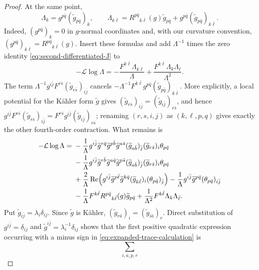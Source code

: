 \documentclass[10pt,a4paper]{amsart}
\begin{document}
\begin{proof}
At the same point,
\[
 \Lambda_k=g^{p\bar q}(\widetilde g_{p\bar q})_k,
 \qquad
 \Lambda_{k\bar\ell}
 =R^{p\bar q}{}_{k\bar\ell}(g)\widetilde g_{p\bar q}
  +g^{p\bar q}(\widetilde g_{p\bar q})_{k\bar\ell}.
\]
Indeed, $(g^{p\bar q})_k=0$ in $g$-normal coordinates and, with
our curvature convention,
$(g^{p\bar q})_{k\bar\ell}=R^{p\bar q}{}_{k\bar\ell}(g)$.
Insert these formulas and add $\Lambda^{-1}$ times the zero identity
\eqref{eq:second-differentiated-J} to
\[
 -\mathcal L\log\Lambda
 =-\frac{F^{k\bar\ell}\Lambda_{k\bar\ell}}{\Lambda}
  +\frac{F^{k\bar\ell}\Lambda_k\Lambda_{\bar\ell}}{\Lambda^2}.
\]
The term
$\Lambda^{-1}g^{i\bar j}F^{r\bar s}
(\widetilde g_{r\bar s})_{i\bar j}$ cancels
$-\Lambda^{-1}F^{k\bar\ell}g^{p\bar q}
(\widetilde g_{p\bar q})_{k\bar\ell}$.  More explicitly, a local
potential for the K\"ahler form $\widetilde g$ gives
$(\widetilde g_{r\bar s})_{i\bar j}
=(\widetilde g_{i\bar j})_{r\bar s}$, and hence
$g^{i\bar j}F^{r\bar s}(\widetilde g_{r\bar s})_{i\bar j}
=F^{r\bar s}g^{i\bar j}(\widetilde g_{i\bar j})_{r\bar s}$;
renaming $(r,s,i,j)$ as $(k,\ell,p,q)$ gives exactly the other
fourth-order contraction.  What remains is
\begin{align}
-\mathcal L\log\Lambda={}&
-\frac1\Lambda g^{i\bar j}\widetilde g^{r\bar q}
 \widetilde g^{p\bar b}\widetilde g^{a\bar s}
 (\widetilde g_{a\bar b})_{\bar j}
 (\widetilde g_{r\bar s})_i\theta_{p\bar q}\notag\\
&-\frac1\Lambda g^{i\bar j}\widetilde g^{r\bar b}
 \widetilde g^{a\bar q}\widetilde g^{p\bar s}
 (\widetilde g_{a\bar b})_{\bar j}
 (\widetilde g_{r\bar s})_i\theta_{p\bar q}\notag\\
&+\frac2\Lambda\operatorname{Re}\!\left(
 g^{i\bar j}\widetilde g^{p\bar\ell}
 \widetilde g^{k\bar q}(\widetilde g_{k\bar\ell})_i
 (\theta_{p\bar q})_{\bar j}\right)
 -\frac1\Lambda g^{i\bar j}\widetilde g^{p\bar q}
 (\theta_{p\bar q})_{i\bar j}\notag\\
&-\frac1\Lambda F^{k\bar\ell}
 R^{p\bar q}{}_{k\bar\ell}(g)\widetilde g_{p\bar q}
 +\frac1{\Lambda^2}F^{k\bar\ell}
 \Lambda_k\Lambda_{\bar\ell}.
\label{eq:expanded-trace-calculation}
\end{align}
Put
$\widetilde g_{i\bar j}=\lambda_i\delta_{ij}$.  Since
$\widetilde g$ is K\"ahler,
$(\widetilde g_{r\bar a})_i=(\widetilde g_{i\bar a})_r$.
Direct substitution of $g^{i\bar j}=\delta_{ij}$ and
$\widetilde g^{i\bar j}=\lambda_i^{-1}\delta_{ij}$ shows that the
first positive quadratic expression occurring with a minus sign in
\eqref{eq:expanded-trace-calculation} is
\[
 \sum_{i,a,p,r}
\]
\end{proof}
\end{document}
